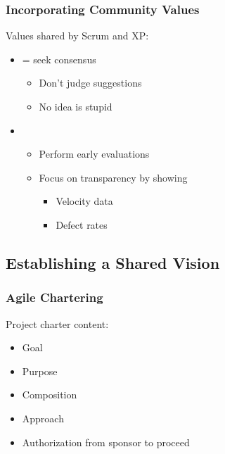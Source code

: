 \documentclass[letterpaper,10pt,english]{jupyterBook}
\begin{document}
\subsubsection{Incorporating Community Values}
\label{\detokenize{APM/agile:incorporating-community-values}}
\sphinxAtStartPar
Values shared by Scrum and XP:
\begin{itemize}
\item {} 
\sphinxAtStartPar
{} = seek consensus
\begin{itemize}
\item {} 
\sphinxAtStartPar
Don’t judge suggestions

\item {} 
\sphinxAtStartPar
No idea is stupid

\end{itemize}

\item {} 
\sphinxAtStartPar
{}
\begin{itemize}
\item {} 
\sphinxAtStartPar
Perform early evaluations

\item {} 
\sphinxAtStartPar
Focus on transparency by showing
\begin{itemize}
\item {} 
\sphinxAtStartPar
Velocity data

\item {} 
\sphinxAtStartPar
Defect rates

\end{itemize}

\end{itemize}

\end{itemize}


\subsection{Establishing a Shared Vision}
\label{\detokenize{APM/agile:establishing-a-shared-vision}}

\subsubsection{Agile Chartering}
\label{\detokenize{APM/agile:agile-chartering}}
\sphinxAtStartPar
Project charter content:
\begin{itemize}
\item {} 
\sphinxAtStartPar
Goal

\item {} 
\sphinxAtStartPar
Purpose

\item {} 
\sphinxAtStartPar
Composition

\item {} 
\sphinxAtStartPar
Approach

\item {} 
\sphinxAtStartPar
Authorization from sponsor to proceed

\end{itemize}
\end{document}
